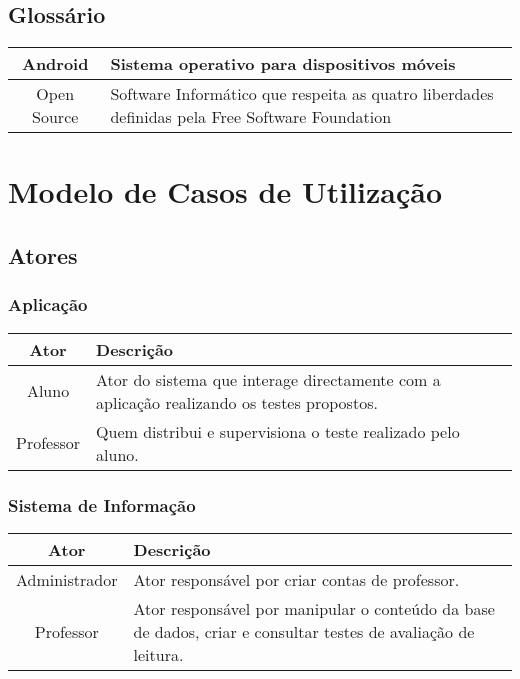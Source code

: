 \documentclass[a4paper,titlepage]{article}
\begin{document}
				\subsection{Glossário}
				\begin{tabular}{|c|p{8cm}|}
				\hline Android & Sistema operativo para dispositivos móveis \\ 
				\hline Open Source  & Software Informático que respeita as quatro liberdades definidas pela Free Software Foundation \\ 
				\hline 
				\end{tabular} 
				
				\newpage
				
				\section{Modelo de Casos de Utilização}
					\subsection{Atores}
						\subsubsection{Aplicação}
							\begin{tabular}{|c|p{9cm}|}
								\hline Ator & Descrição \\ 
								\hline  Aluno  & Ator do sistema que interage directamente com a aplicação realizando os testes propostos. \\ 
								\hline  Professor  & Quem distribui e supervisiona o teste realizado pelo aluno. \\ 
								\hline 
							\end{tabular} 
						\subsubsection{Sistema de Informação}
							\begin{tabular}{|c|p{8cm}|}
								\hline Ator & Descrição \\ 
								\hline  Administrador  & Ator responsável por criar contas de professor.    \\ 
								\hline  Professor  & Ator responsável por manipular o conteúdo da base de dados, criar e consultar testes de avaliação de leitura. \\ 
								\hline 
							\end{tabular} 			

				
				
		
		
\end{document}
